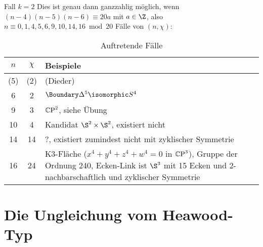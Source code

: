 \begin{seg}{Fall $k = 2$}
    Dies ist genau dann ganzzahlig möglich, wenn $(n-4)(n-5)(n-6) \equiv 20 a$ mit $a \in \Z$, also
    \begin{math}
        n \equiv 0, 1, 4, 5, 6, 9, 10, 14, 16 \bmod 20
    \end{math}
    Fälle von $(n,\chi)$:
    \begin{table}
        \centering
        \begin{tabular}{ccl}
            $n$ & $\chi$ & Beispiele \\ \hline
            (5) & (2) & (Dieder) \\
            6 & 2 & $\Boundary \Delta^5 \isomorphic S^4$ \\
            9 & 3 & $\mathrm { \mathbb{C}P }^2$, siehe Übung \\
            10 & 4 & Kandidat $\S^2 \times \S^2$, existiert nicht \\
            14 & 14 & ?, existiert zumindest nicht mit zyklischer Symmetrie \\
            16 & 24 & K3-Fläche ($x^4 + y^4 + z^4 + w^4 = 0$ in $\mathrm { \mathbb{C}P }^3$), Gruppe der Ordnung 240, Ecken-Link ist $\S^3$ mit 15 Ecken und 2-nachbarschaftlich und zyklischer Symmetrie
        \end{tabular}
        \caption{Auftretende Fälle}
    \end{table}
\end{seg}

\section{Die Ungleichung vom Heawood-Typ}

